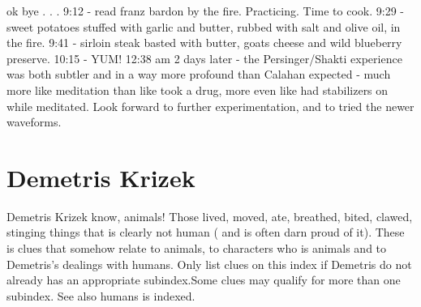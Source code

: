\documentclass[12pt]{book}
\begin{document}
ok bye . . .  9:12 - read franz bardon by the fire. Practicing. Time to cook. 9:29 - sweet potatoes stuffed with garlic and butter, rubbed with salt and olive oil, in the fire. 9:41 - sirloin steak basted with butter, goats cheese and wild blueberry preserve. 10:15 - YUM! 12:38 am 2 days later - the Persinger/Shakti experience was both subtler and in a way more profound than Calahan expected - much more like meditation than like took a drug, more even like had stabilizers on while meditated. Look forward to further experimentation, and to tried the newer waveforms.



\chapter{Demetris Krizek}

Demetris Krizek know, animals! Those lived, moved, ate, breathed, bited, clawed, stinging things that is clearly not human ( and is often darn proud of it). These is clues that somehow relate to animals, to characters who is animals and to Demetris's dealings with humans. Only list clues on this index if Demetris do not already has an appropriate subindex.Some clues may qualify for more than one subindex. See also humans is indexed.
\end{document}
